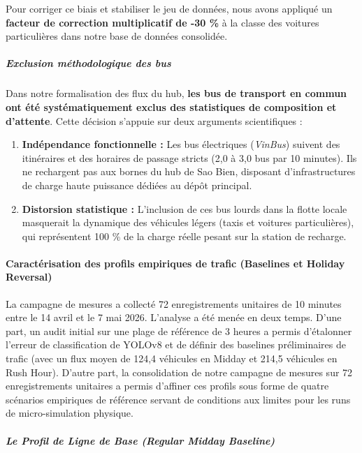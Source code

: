 \documentclass[10pt, a4paper]{article}
\providecommand{\tightlist}{}
\begin{document}
Pour corriger ce biais et stabiliser le jeu de données, nous avons
appliqué un \textbf{facteur de correction multiplicatif de -30 \%} à la
classe des voitures particulières dans notre base de données consolidée.

\subparagraph{Exclusion méthodologique des
bus}\label{exclusion-muxe9thodologique-des-bus}

Dans notre formalisation des flux du hub, \textbf{les bus de transport
en commun ont été systématiquement exclus des statistiques de
composition et d'attente}. Cette décision s'appuie sur deux arguments
scientifiques :

\begin{enumerate}
\def\labelenumi{\arabic{enumi}.}
\tightlist
\item
  \textbf{Indépendance fonctionnelle :} Les bus électriques
  (\emph{VinBus}) suivent des itinéraires et des horaires de passage
  stricts (2,0 à 3,0 bus par 10 minutes). Ils ne rechargent pas aux
  bornes du hub de Sao Bien, disposant d'infrastructures de charge haute
  puissance dédiées au dépôt principal.
\item
  \textbf{Distorsion statistique :} L'inclusion de ces bus lourds dans
  la flotte locale masquerait la dynamique des véhicules légers (taxis
  et voitures particulières), qui représentent 100 \% de la charge
  réelle pesant sur la station de recharge.
\end{enumerate}

\paragraph{Caractérisation des profils empiriques de trafic (Baselines
et Holiday
Reversal)}\label{caractuxe9risation-des-profils-empiriques-de-trafic-baselines-et-holiday-reversal}

La campagne de mesures a collecté 72 enregistrements unitaires de 10
minutes entre le 14 avril et le 7 mai 2026. L'analyse a été menée en
deux temps. D'une part, un audit initial sur une plage de référence de 3
heures a permis d'étalonner l'erreur de classification de YOLOv8 et de
définir des baselines préliminaires de trafic (avec un flux moyen de
124,4 véhicules en Midday et 214,5 véhicules en Rush Hour). D'autre
part, la consolidation de notre campagne de mesures sur 72
enregistrements unitaires a permis d'affiner ces profils sous forme de
quatre scénarios empiriques de référence servant de conditions aux
limites pour les runs de micro-simulation physique.

\subparagraph{Le Profil de Ligne de Base (Regular Midday
Baseline)}\label{le-profil-de-ligne-de-base-regular-midday-baseline}
\end{document}
